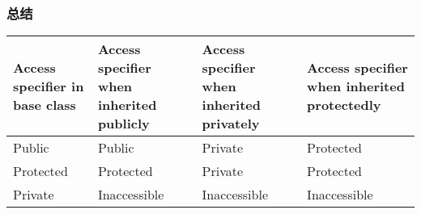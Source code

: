 \documentclass[../../LearnCpp.tex]{subfiles}
\begin{document}
\subsubsection*{总结}

\begin{center}
    \begin{tiny}
        \begin{tabularx}{ 1\textwidth}{
                | >{\raggedright\arraybackslash}X
                | >{\raggedright\arraybackslash}X
                | >{\raggedright\arraybackslash}X
                | >{\raggedright\arraybackslash}X |
            }
            \hline
            Access specifier in base class & Access specifier when inherited publicly & Access specifier when inherited privately & Access specifier when inherited protectedly \\
            \hline
            Public                         & Public                                   & Private                                   & Protected                                   \\
            Protected                      & Protected                                & Private                                   & Protected                                   \\
            Private                        & Inaccessible                             & Inaccessible                              & Inaccessible                                \\
            \hline
        \end{tabularx}
    \end{tiny}
\end{center}
\end{document}
